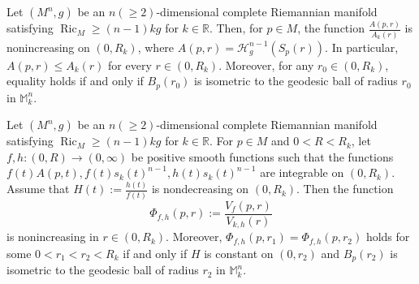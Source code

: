 \documentclass[10pt,a4paper]{amsart}
\newcommand{\Ric}{\operatorname{Ric}}
\begin{document}
\begin{lemma} \label{lem:area-comparison}
Let \((M^n,g)\) be an $n(\geq 2)$-dimensional complete Riemannian manifold satisfying $\Ric_M\geq(n-1)kg$ for \(k\in\mathbb{R}\). Then, for $p\in M$, the function $\frac{A(p,r)}{A_k (r)}$ is nonincreasing on \((0,R_k)\), where $A(p,r)=\mathcal H_g^{n-1}(S_p(r))$. In particular, $A(p,r)\leq A_k(r)$ for every $r\in(0,R_k)$. Moreover, for any $r_0\in(0,R_k)$, equality holds if and only if $B_p(r_0)$ is isometric to the geodesic ball of radius $r_0$ in $\mathbb{M}_k^n$.
\end{lemma}

\begin{theorem} \label{thm:main}
Let $(M^n,g)$ be an $n(\geq 2)$-dimensional complete Riemannian manifold satisfying $\Ric_M\geq(n-1)kg$ for \(k\in\mathbb{R}\). For \(p\in M\) and  \(0<R<R_k\), let $f,h\colon(0,R)\rightarrow(0,\infty)$ be positive smooth functions such that 
the functions $f(t)A(p,t), f(t)s_k(t)^{n-1}, h(t)s_k(t)^{n-1}$ are integrable on \((0,R_k)\). Assume that $H(t):=\frac{h(t)}{f(t)}$ is nondecreasing on \((0,R_k)\). Then the function 
$$\Phi_{f,h}(p,r) := \frac{V_f(p,r)}{V_{k,h}(r)}$$
 is nonincreasing in $r \in (0,R_k)$. Moreover, $\Phi_{f,h}(p,r_1)=\Phi_{f,h}(p,r_2)$ holds for some \(0<r_1<r_2<R_k\) if and only if \(H\) is constant on \((0,r_2)\) and $B_p(r_2)$ is isometric to the geodesic ball of radius $r_2$ in $\mathbb M_k^n$.
\end{theorem}
\end{document}
